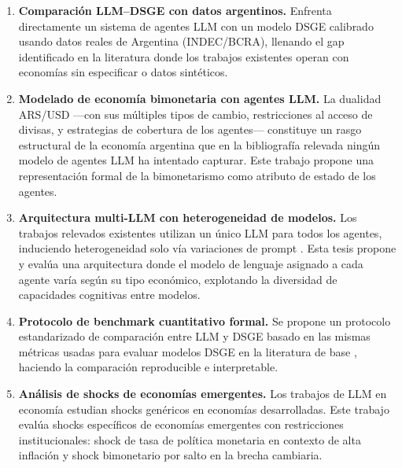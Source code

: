 \begin{enumerate}
    \item \textbf{Comparación LLM--DSGE con datos argentinos.} Enfrenta directamente un sistema 
    de agentes LLM con un modelo DSGE calibrado usando datos reales de Argentina (INDEC/BCRA), 
    llenando el gap identificado en la literatura donde los trabajos existentes \citep{EconAgent2024, EconGrowthAgent2025} 
    operan con economías sin especificar o datos sintéticos.

    \item \textbf{Modelado de economía bimonetaria con agentes LLM.} La dualidad ARS/USD
    ---con sus múltiples tipos de cambio, restricciones al acceso de divisas, y estrategias
    de cobertura de los agentes--- constituye un rasgo estructural de la economía argentina
    que en la bibliografía relevada ningún modelo de agentes LLM ha intentado capturar. 
    Este trabajo propone una representación formal de la bimonetarismo como atributo de estado de los agentes.

    \item \textbf{Arquitectura multi-LLM con heterogeneidad de modelos.} Los trabajos
    relevados existentes utilizan un único LLM para todos los agentes, induciendo heterogeneidad solo
    vía variaciones de prompt \citep{EconAgent2024}. Esta tesis propone y evalúa una
    arquitectura donde el modelo de lenguaje asignado a cada agente varía según su tipo
    económico, explotando la diversidad de capacidades cognitivas entre modelos.

    \item \textbf{Protocolo de benchmark cuantitativo formal.} Se propone un protocolo
    estandarizado de comparación entre LLM y DSGE basado en las mismas métricas usadas
    para evaluar modelos DSGE en la literatura de base \citep{SmetsWouters2007}, haciendo
    la comparación reproducible e interpretable.

    \item \textbf{Análisis de shocks de economías emergentes.} Los trabajos de LLM en
    economía estudian shocks genéricos en economías desarrolladas. Este trabajo evalúa
    shocks específicos de economías emergentes con restricciones institucionales: shock de
    tasa de política monetaria en contexto de alta inflación y shock bimonetario por salto
    en la brecha cambiaria.
\end{enumerate}

